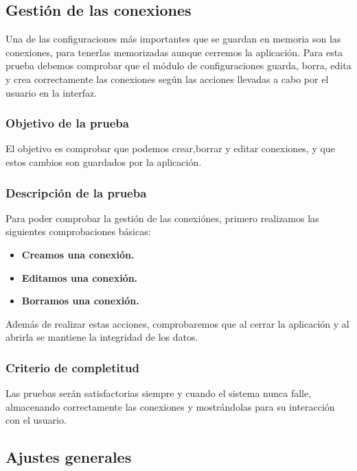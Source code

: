 \subsection{Gestión de las conexiones}

Una de las configuraciones más importantes que se guardan en memoria son las conexiones, para tenerlas memorizadas aunque cerremos la aplicación. Para esta prueba debemos comprobar que el módulo de configuraciones guarda, borra, edita y crea correctamente las conexiones según las acciones llevadas a cabo por el usuario en la interfaz.


\subsubsection{Objetivo de la prueba}

El objetivo es comprobar que podemos crear,borrar y editar conexiones, y que estos cambios son guardados por la aplicación.

\subsubsection{Descripción de la prueba}

Para poder comprobar la gestión de las conexiónes, primero realizamos las siguientes comprobaciones básicas:


\begin{itemize}
  \item \textbf{Creamos una conexión.}
  \item \textbf{Editamos una conexión.}
  \item \textbf{Borramos una conexión.}
\end{itemize}

\bigskip
Además de realizar estas acciones, comprobaremos que al cerrar la aplicación y al abrirla se mantiene la integridad de los datos.

\subsubsection{Criterio de completitud}

Las pruebas serán satisfactorias siempre y cuando el sistema nunca falle, almacenando correctamente las conexiones y mostrándolas para su interacción con el usuario.

\subsection{Ajustes generales}


